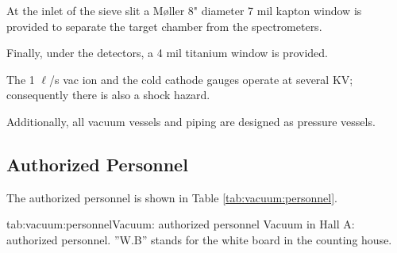 At the inlet of the sieve slit a M{\o}ller 8" diameter 7 mil kapton window 
is provided to separate the target chamber from the spectrometers.

Finally, under the detectors, a 4 mil titanium window is provided.  

The 1 $\ell$/s vac ion and the cold cathode gauges operate at several 
KV; consequently there is also a shock hazard.

Additionally, all vacuum vessels and piping are designed as pressure 
vessels.

\infolevone{\newpage}
\begin{safetyen}{10}{15}
\section{Authorized Personnel}
\end{safetyen}
The authorized personnel is shown in Table \ref{tab:vacuum:personnel}.
\begin{namestab}{tab:vacuum:personnel}{Vacuum: authorized personnel}{%
      Vacuum in Hall A: authorized personnel. ''W.B'' stands for the white board 
      in the counting house.}
  \EdFolts{}
\end{namestab}


%
%
